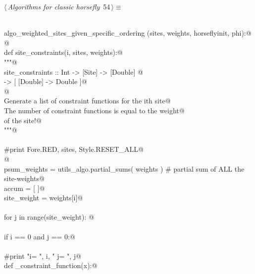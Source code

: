 \documentclass[11.5pt]{report}
\begin{document}
\vspace{-0.8cm} \newchunk
\begin{flushleft} \small\label{scrap79}\raggedright\small
{} $\langle\,${\itshape Algorithms for classic horsefly}\nobreak\ {\footnotesize {54}}$\,\rangle\equiv$
\vspace{-1ex}
\begin{list}{}{} \item
\mbox{}\verb@@\\
\mbox{}\verb@def algo_weighted_sites_given_specific_ordering (sites, weights, horseflyinit, phi):@\\
\mbox{}\verb@      @\\
\mbox{}\verb@     def site_constraints(i, sites, weights):@\\
\mbox{}\verb@          """@\\
\mbox{}\verb@          site_constraints :: Int -> [Site] -> [Double] @\\
\mbox{}\verb@                          -> [ [Double] -> Double  ]@\\
\mbox{}\verb@          @\\
\mbox{}\verb@          Generate a list of constraint functions for the ith site@\\
\mbox{}\verb@          The number of constraint functions is equal to the weight@\\
\mbox{}\verb@          of the site!@\\
\mbox{}\verb@          """@\\
\mbox{}\verb@@\\
\mbox{}\verb@          #print Fore.RED, sites, Style.RESET_ALL@\\
\mbox{}\verb@         @\\
\mbox{}\verb@          psum_weights = utils_algo.partial_sums( weights ) # partial sum of ALL the site-weights@\\
\mbox{}\verb@          accum        = [ ]@\\
\mbox{}\verb@          site_weight  = weights[i]@\\
\mbox{}\verb@@\\
\mbox{}\verb@          for j in range(site_weight): @\\
\mbox{}\verb@@\\
\mbox{}\verb@              if i == 0 and j == 0:@\\
\mbox{}\verb@@\\
\mbox{}\verb@                    #print "i= ", i, " j= ", j@\\
\mbox{}\verb@                    def _constraint_function(x):@\\

\end{list}
\end{flushleft}
\end{document}
